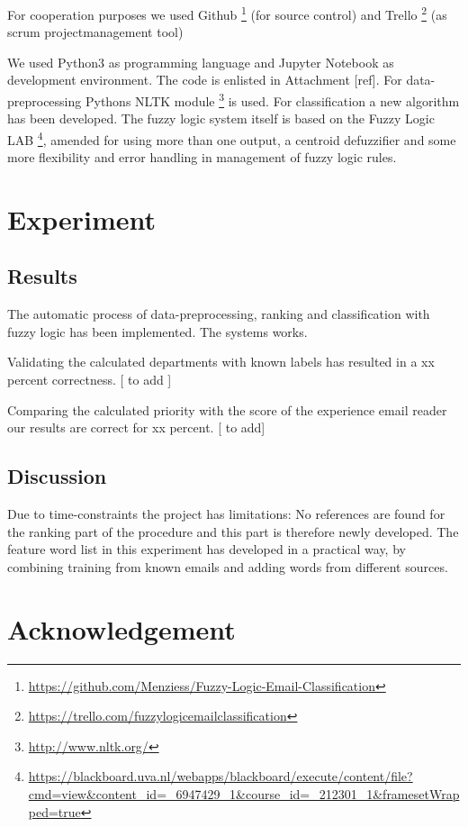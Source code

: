 \documentclass[journal]{IEEEtran}
\begin{document}
For cooperation purposes we used Github \footnote{\url{https://github.com/Menziess/Fuzzy-Logic-Email-Classification}} (for source control) and Trello \footnote{\url{https://trello.com/fuzzylogicemailclassification}} (as scrum projectmanagement tool)

We used Python3 as programming language and Jupyter Notebook as development
environment. The code is enlisted in Attachment [ref]. For data-preprocessing Pythons NLTK module \footnote{\url{http://www.nltk.org/}} is used. For classification a new algorithm has been developed. The fuzzy logic system itself is based on the Fuzzy Logic LAB \footnote{\url{https://blackboard.uva.nl/webapps/blackboard/execute/content/file?cmd=view&content_id=_6947429_1&course_id=_212301_1&framesetWrapped=true}}, amended for using more than one output, a centroid defuzzifier and some more flexibility and error handling in management of fuzzy logic rules.

\section{Experiment}

\subsection{Results}

The automatic process of data-preprocessing, ranking and classification with fuzzy logic has been implemented. The systems works.

Validating the calculated departments with known labels has resulted in a xx percent correctness. [ to add ]

Comparing the calculated priority with the score of the experience email reader our results are correct for xx percent. [ to add]

\subsection{Discussion}

Due to time-constraints the project has limitations: No references are found for the ranking part of the procedure and this part is therefore newly developed. The feature word list in this experiment has developed in a practical way, by combining training from known emails and adding words from different sources.

\section{Acknowledgement}
\end{document}
